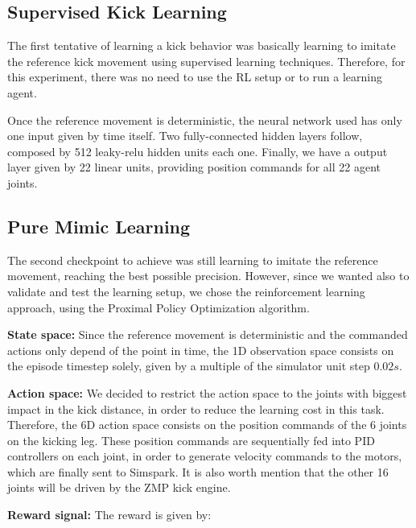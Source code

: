 \subsection{Supervised Kick Learning}

The first tentative of learning a kick behavior was basically learning to imitate the reference kick movement using supervised learning techniques. Therefore, for this experiment, there was no need to use the RL setup or to run a learning agent.

Once the reference movement is deterministic, the neural network used has only one input given by time itself. Two fully-connected hidden layers follow, composed by 512 leaky-relu hidden units each one. Finally, we have a output layer given by 22 linear units, providing position commands for all 22 agent joints.


\subsection{Pure Mimic Learning}

The second checkpoint to achieve was still learning to imitate the reference movement, reaching the best possible precision. However, since we wanted also to validate and test the learning setup, we chose the reinforcement learning approach, using the Proximal Policy Optimization algorithm.

\textbf{State space:} Since the reference movement is deterministic and the commanded actions only depend of the point in time, the 1D observation space consists on the episode timestep solely, given by a multiple of the simulator unit step $0.02s$.

\textbf{Action space:} We decided to restrict the action space to the joints with biggest impact in the kick distance, in order to reduce the learning cost in this task. Therefore, the 6D action space consists on the position commands of the 6 joints on the kicking leg. These position commands are sequentially fed into PID controllers on each joint, in order to generate velocity commands to the motors, which are finally sent to Simspark. It is also worth mention that the other 16 joints will be driven by the ZMP kick engine.

\textbf{Reward signal:} The reward is given by:

